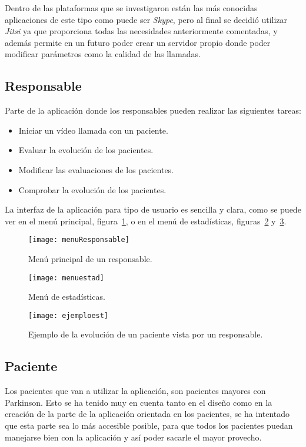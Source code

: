 Dentro de las plataformas que se investigaron están las más conocidas aplicaciones de este tipo como puede ser \textit{Skype}, pero al final se decidió utilizar \textit{Jitsi} ya que proporciona todas las necesidades anteriormente comentadas, y además permite en un futuro poder crear un servidor propio donde poder modificar parámetros como la calidad de las llamadas.

\subsection{Responsable}
Parte de la aplicación donde los responsables pueden realizar las siguientes tareas:
\begin{itemize}
	\item Iniciar un vídeo llamada con un paciente.
	\item Evaluar la evolución de los pacientes.
	\item Modificar las evaluaciones de los pacientes.
	\item Comprobar la evolución de los pacientes.
\end{itemize}

La interfaz de la aplicación para tipo de usuario es sencilla y clara, como se puede ver en el menú principal, figura~\ref{fig:menuPaciente}, o en el menú de estadísticas, figuras~\ref{fig:menuest} y~\ref{fig:ejemploest}.

\begin{figure}[h]
	\centering
	\texttt{[image: menuResponsable]}
	\caption{Menú principal de un responsable.}
	\label{fig:menuPaciente}
\end{figure}

\begin{figure}[h]
	\centering
	\texttt{[image: menuestad]}
	\caption{Menú de estadísticas.}
	\label{fig:menuest}
\end{figure}

\begin{figure}[h]
	\centering
	\texttt{[image: ejemploest]}
	\caption{Ejemplo de la evolución de un paciente vista por un responsable.}
	\label{fig:ejemploest}
\end{figure}

\subsection{Paciente}
Los pacientes que van a utilizar la aplicación, son pacientes mayores con Parkinson. Esto se ha tenido muy en cuenta tanto en el diseño como en la creación de la parte de la aplicación orientada en los pacientes, se ha intentado que esta parte sea lo más accesible posible, para que todos los pacientes puedan manejarse bien con la aplicación y así poder sacarle el mayor provecho.

